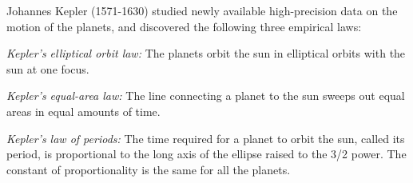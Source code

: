 Johannes Kepler (1571-1630) studied newly available high-precision data
on the motion of the planets, and discovered the following three empirical laws:

\emph{Kepler's elliptical orbit law:} The planets orbit the sun in
elliptical orbits with the sun at one focus.

\emph{Kepler's equal-area law:} The line connecting a planet to the sun sweeps out equal  
areas in equal amounts of time.

\emph{Kepler's law of periods:} The time required for a planet to orbit the sun, called its
period, is proportional to the long axis of the ellipse
raised to the 3/2 power. The constant of proportionality is 
the same for all the planets.

